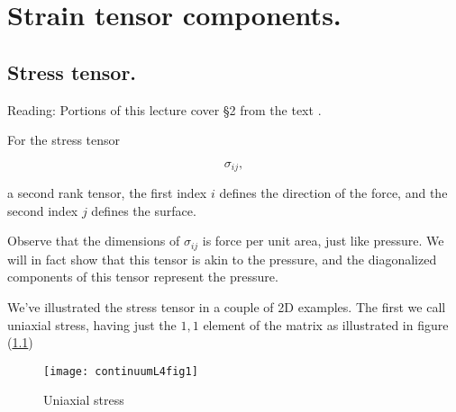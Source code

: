 %
%

\chapter{Strain tensor components.}
\label{chap:continuumL4}
{}
\date{Jan 20, 2012}

\beginArtWithToc

%

\section{Stress tensor.}

Reading: Portions of this lecture cover \S 2 from the text \cite{landau1960theory}.

For the stress tensor

\begin{equation}\label{eqn:continuumL4:10}
\sigma_{ij},
\end{equation}

a second rank tensor, the first index $i$ defines the direction of the force, and the second index $j$ defines the surface.

Observe that the dimensions of $\sigma_{ij}$ is force per unit area, just like pressure.  We will in fact show that this tensor is akin to the pressure, and the diagonalized components of this tensor represent the pressure.

We've illustrated the stress tensor in a couple of 2D examples.  The first we call uniaxial stress, having just the $1,1$ element of the matrix as illustrated in figure (\ref{fig:continuumL4:continuumL4fig1})

\begin{figure}[htp]
   \centering
   \texttt{[image: continuumL4fig1]}
   \caption{Uniaxial stress}\label{fig:continuumL4:continuumL4fig1}
\end{figure}

